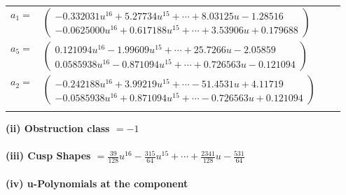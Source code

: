 \documentclass[1p]{elsarticle_modified}
\theoremstyle{definition}
\begin{document}
\begin{tabular}{m{7pt} m{180pt} m{7pt} m{180pt} }
\flushright $a_{1}=$&$\begin{pmatrix}-0.332031 u^{16}+5.27734 u^{15}+\cdots+8.03125 u-1.28516\\-0.0625000 u^{16}+0.617188 u^{15}+\cdots+3.53906 u+0.179688\end{pmatrix}$ \\
\flushright $a_{5}=$&$\begin{pmatrix}0.121094 u^{16}-1.99609 u^{15}+\cdots+25.7266 u-2.05859\\0.0585938 u^{16}-0.871094 u^{15}+\cdots+0.726563 u-0.121094\end{pmatrix}$ \\
\flushright $a_{2}=$&$\begin{pmatrix}-0.242188 u^{16}+3.99219 u^{15}+\cdots-51.4531 u+4.11719\\-0.0585938 u^{16}+0.871094 u^{15}+\cdots-0.726563 u+0.121094\end{pmatrix}$\\&\end{tabular}
\flushleft \textbf{(ii) Obstruction class $= -1$}\\~\\
\flushleft \textbf{(iii) Cusp Shapes $= \frac{39}{128} u^{16}-\frac{315}{64} u^{15}+\cdots+\frac{2341}{128} u-\frac{531}{64}$}\\~\\
\newpage\renewcommand{\arraystretch}{1}
\flushleft \textbf{(iv) u-Polynomials at the component}\newline \\
\end{document}

